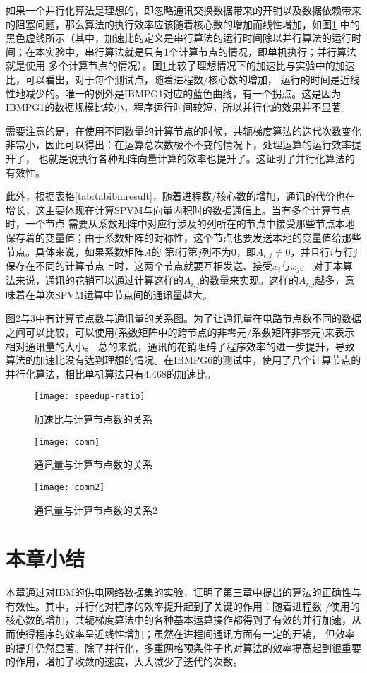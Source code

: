 如果一个并行化算法是理想的，即忽略通讯交换数据带来的开销以及数据依赖带来的阻塞问题，那么算法的执行效率应该随着核心数的增加而线性增加，如图\ref{fig:figspeedupratio}
中的黑色虚线所示（其中，加速比的定义是串行算法的运行时间除以并行算法的运行时间；在本实验中，串行算法就是只有1个计算节点的情况，即单机执行；并行算法就是使用
多个计算节点的情况）。图\ref{fig:figspeedupratio}比较了理想情况下的加速比与实验中的加速比，可以看出，对于每个测试点，随着进程数/核心数的增加，
运行的时间是近线性地减少的。唯一的例外是IBMPG1对应的蓝色曲线，有一个拐点。这是因为IBMPG1的数据规模比较小，程序运行时间较短，所以并行化的效果并不显著。

需要注意的是，在使用不同数量的计算节点的时候，共轭梯度算法的迭代次数变化非常小，因此可以得出：在运算总次数极不不变的情况下，处理运算的运行效率提升了，
也就是说执行各种矩阵向量计算的效率也提升了。这证明了并行化算法的有效性。

此外，根据表格\ref{tab:tabibmresult}，随着进程数/核心数的增加，通讯的代价也在增长，这主要体现在计算SPVM与向量内积时的数据通信上。当有多个计算节点时，一个节点
需要从系数矩阵中对应行涉及的列所在的节点中接受那些节点本地保存着的变量值；由于系数矩阵的对称性，这个节点也要发送本地的变量值给那些节点。具体来说，如果系数矩阵$A$的
第$i$行第$j$列不为0，即$A_{i,j}\neq 0$，并且行$i$与行$j$保存在不同的计算节点上时，这两个节点就要互相发送、接受$x_i$与$x_j$。
对于本算法来说，通讯的花销可以通过计算这样的$A_{i,j}$的数量来实现。这样的$A_{i,j}$越多，意味着在单次SPVM运算中节点间的通讯量越大。

图\ref{fig:figcomm}与\ref{fig:figcomm2}中有计算节点数与通讯量的关系图。为了让通讯量在电路节点数不同的数据之间可以比较，可以使用(系数矩阵中的跨节点的非零元$/$系数矩阵非零元)来表示相对通讯量的大小。
总的来说，通讯的花销阻碍了程序效率的进一步提升，导致算法的加速比没有达到理想的情况。在IBMPG6的测试中，使用了八个计算节点的并行化算法，相比单机算法只有4.468的加速比。



\begin{figure}[H]
  \centering
  \texttt{[image: speedup-ratio]}
  \caption{加速比与计算节点数的关系}
  \label{fig:figspeedupratio}
\end{figure}

\begin{figure}[H]
  \centering
  \texttt{[image: comm]}
  \caption{通讯量与计算节点数的关系}
  \label{fig:figcomm}
\end{figure}


\begin{figure}[H]
  \centering
  \texttt{[image: comm2]}
  \caption{通讯量与计算节点数的关系2}
  \label{fig:figcomm2}
\end{figure}

\section{本章小结}

本章通过对IBM的供电网络数据集的实验，证明了第三章中提出的算法的正确性与有效性。其中，并行化对程序的效率提升起到了关键的作用：随着进程数
/使用的核心数的增加，共轭梯度算法中的各种基本运算操作都得到了有效的并行加速，从而使得程序的效率呈近线性增加；虽然在进程间通讯方面有一定的开销，
但效率的提升仍然显著。除了并行化，多重网格预条件子也对算法的效率提高起到很重要的作用，增加了收敛的速度，大大减少了迭代的次数。
